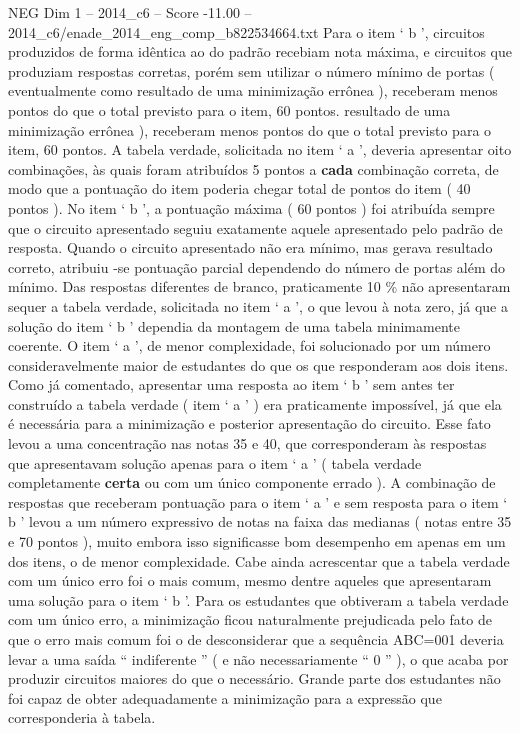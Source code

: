 \begin{textsample}{NEG Dim 1 – 2014\_c6 – Score -11.00 – 2014\_c6/enade\_2014\_eng\_comp\_b822534664.txt}
Para o item ‘ b ’, circuitos produzidos de forma idêntica ao do padrão recebiam nota máxima, e circuitos que produziam respostas corretas, porém sem utilizar o número mínimo de portas ( eventualmente como resultado de uma minimização errônea ), receberam menos pontos do que o total previsto para o item, 60 pontos. resultado de uma minimização errônea ), receberam menos pontos do que o total previsto para o item, 60 pontos.
A tabela verdade, solicitada no item ‘ a ’, deveria apresentar oito combinações, às quais foram atribuídos 5 pontos a \textbf{cada} combinação correta, de modo que a pontuação do item poderia chegar total de pontos do item ( 40 pontos ).
No item ‘ b ’, a pontuação máxima ( 60 pontos ) foi atribuída sempre que o circuito apresentado seguiu exatamente aquele apresentado pelo padrão de resposta.
Quando o circuito apresentado não era mínimo, mas gerava resultado correto, atribuiu -se pontuação parcial dependendo do número de portas além do mínimo.
Das respostas diferentes de branco, praticamente 10 \% não apresentaram sequer a tabela verdade, solicitada no item ‘ a ’, o que levou à nota zero, já que a solução do item ‘ b ’ dependia da montagem de uma tabela minimamente coerente.
O item ‘ a ’, de menor complexidade, foi solucionado por um número consideravelmente maior de estudantes do que os que responderam aos dois itens.
Como já comentado, apresentar uma resposta ao item ‘ b ’ sem antes ter construído a tabela verdade ( item ‘ a ’ ) era praticamente impossível, já que ela é necessária para a minimização e posterior apresentação do circuito.
Esse fato levou a uma concentração nas notas 35 e 40, que corresponderam às respostas que apresentavam solução apenas para o item ‘ a ’ ( tabela verdade completamente \textbf{certa} ou com um único componente errado ).
A combinação de respostas que receberam pontuação para o item ‘ a ’ e sem resposta para o item ‘ b ’ levou a um número expressivo de notas na faixa das medianas ( notas entre 35 e 70 pontos ), muito embora isso significasse bom desempenho em apenas em um dos itens, o de menor complexidade.
Cabe ainda acrescentar que a tabela verdade com um único erro foi o mais comum, mesmo dentre aqueles que apresentaram uma solução para o item ‘ b ’.
Para os estudantes que obtiveram a tabela verdade com um único erro, a minimização ficou naturalmente prejudicada pelo fato de que o erro mais comum foi o de desconsiderar que a sequência ABC=001 deveria levar a uma saída “ indiferente ” ( e não necessariamente “ 0 ” ), o que acaba por produzir circuitos maiores do que o necessário.
Grande parte dos estudantes não foi capaz de obter adequadamente a minimização para a expressão que corresponderia à tabela.

\end{textsample}
